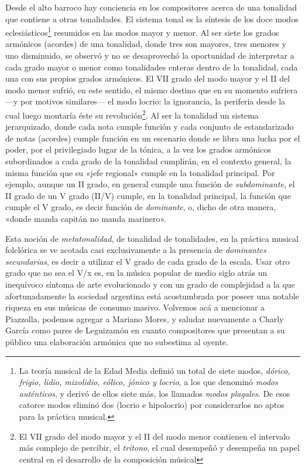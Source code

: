 Desde el alto barroco hay conciencia en los compositores acerca de una tonalidad que contiene a otras tonalidades. El sistema tonal es la síntesis de los doce modos eclesiásticos\footnote{La teoría musical de la Edad Media definió un total de siete modos, \emph{dórico, frigio, lidio, mixolidio, eólico, jónico y locrio}, a los que denominó \emph{modos auténticos}, y derivó de ellos siete más, los llamados \emph{modos plagales}. De esos catorce modos eliminó dos (locrio e hipolocrio) por considerarlos no aptos para la práctica musical.} resumidos en las modos mayor y menor. Al ser siete los grados armónicos (acordes) de una tonalidad, donde tres son mayores, tres menores y uno disminuido, se observó y no se desaprovechó la oportunidad de interpretar a cada grado mayor o menor como tonalidades enteras dentro de la tonalidad, cada una con sus propios grados armónicos. El VII grado del modo mayor y el II del modo menor sufrió, en este sentido, el mismo destino que en su momento sufriera ---y por motivos similares--- el modo locrio: la ignorancia, la periferia desde la cual luego montaría éste su revolución\footnote{El VII grado del modo mayor y el II del modo menor contienen el intervalo más complejo de percibir, el \emph{tritono}, el cual desempeñó y desempeña un papel central en el desarrollo de la composición músical}. Al ser la tonalidad un sistema jerarquizado, donde cada nota cumple función y cada conjunto de estandarizado de notas (acordes) cumple función en un escenario donde se libra una lucha por el poder, por el privilegiado lugar de la tónica, a la vez los grados armónicos subordinados a cada grado de la tonalidad cumplirán, en el contexto general, la misma función que su «jefe regional» cumple en la tonalidad principal. Por ejemplo, aunque un II grado, en general cumple una función de \emph{subdominante}, el II grado de un V grado (II/V) cumple, en la tonalidad principal, la función que cumple el V grado, es decir función de \emph{dominante}, o, dicho de otra manera, «donde manda capitán no manda marinero».

Esta noción de \emph{metatonalidad}, de tonalidad de tonalidades, en la práctica musical folclórica se ve acotada casi exclusivamente a la presencia de \emph{dominantes secundarias}, es decir a utilizar el V grado de cada grado de la escala. Usar otro grado que no sea el V/x es, en la música popular de medio siglo atrás un inequívoco síntoma de arte evolucionado y con un grado de complejidad a la que afortunadamente la sociedad argentina está acostumbrada por poseer una notable riqueza en sus músicas de consumo masivo. Volvemos acá a mencionar a Piazzolla, podemos agregar a Mariano Mores, y saludar nuevamente a Charly García como pares de Leguizamón en cuanto compositores que presentan a su público una elaboración armónica que no subestima al oyente.

